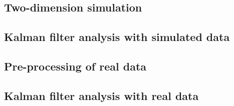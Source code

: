 \documentclass[12pt, a4paper]{article} %
\begin{document}
\setlength{\parskip}{0mm}

\setlength{\parskip}{4mm}


\subsection{Two-dimension simulation}

\setlength{\parskip}{0mm}

\setlength{\parskip}{4mm}

\subsection{Kalman filter analysis with simulated data}

\setlength{\parskip}{0mm}

\setlength{\parskip}{4mm}

\subsection{Pre-processing of real data}

\setlength{\parskip}{0mm}

\setlength{\parskip}{4mm}

\subsection{Kalman filter analysis with real data}

\setlength{\parskip}{0mm}

\setlength{\parskip}{4mm}

\newpage

\newpage

\end{document}
